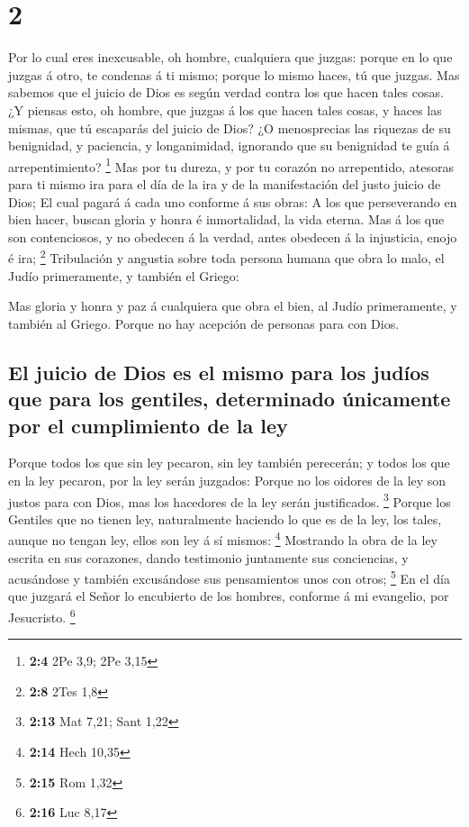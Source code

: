 \hypertarget{section-1}{%
\section{2}\label{section-1}}

 Por lo cual eres inexcusable, oh hombre, cualquiera que
juzgas: porque en lo que juzgas á otro, te condenas á ti mismo; porque
lo mismo haces, tú que juzgas.  Mas sabemos que el juicio
de Dios es según verdad contra los que hacen tales cosas. 
¿Y piensas esto, oh hombre, que juzgas á los que hacen tales cosas, y
haces las mismas, que tú escaparás del juicio de Dios?  ¿O
menosprecias las riquezas de su benignidad, y paciencia, y longanimidad,
ignorando que su benignidad te guía á arrepentimiento? \footnote{\textbf{2:4}
  2Pe 3,9; 2Pe 3,15}  Mas por tu dureza, y por tu corazón
no arrepentido, atesoras para ti mismo ira para el día de la ira y de la
manifestación del justo juicio de Dios;  El cual pagará á
cada uno conforme á sus obras:  A los que perseverando en
bien hacer, buscan gloria y honra é inmortalidad, la vida eterna.
 Mas á los que son contenciosos, y no obedecen á la
verdad, antes obedecen á la injusticia, enojo é ira; \footnote{\textbf{2:8}
  2Tes 1,8}  Tribulación y angustia sobre toda persona
humana que obra lo malo, el Judío primeramente, y también el Griego:

 Mas gloria y honra y paz á cualquiera que obra el bien,
al Judío primeramente, y también al Griego.  Porque no
hay acepción de personas para con Dios.

\hypertarget{el-juicio-de-dios-es-el-mismo-para-los-juduxedos-que-para-los-gentiles-determinado-uxfanicamente-por-el-cumplimiento-de-la-ley}{%
\subsection{El juicio de Dios es el mismo para los judíos que para los
gentiles, determinado únicamente por el cumplimiento de la
ley}\label{el-juicio-de-dios-es-el-mismo-para-los-juduxedos-que-para-los-gentiles-determinado-uxfanicamente-por-el-cumplimiento-de-la-ley}}

 Porque todos los que sin ley pecaron, sin ley también
perecerán; y todos los que en la ley pecaron, por la ley serán juzgados:
 Porque no los oidores de la ley son justos para con
Dios, mas los hacedores de la ley serán justificados. \footnote{\textbf{2:13}
  Mat 7,21; Sant 1,22}  Porque los Gentiles que no tienen
ley, naturalmente haciendo lo que es de la ley, los tales, aunque no
tengan ley, ellos son ley á sí mismos: \footnote{\textbf{2:14} Hech
  10,35}  Mostrando la obra de la ley escrita en sus
corazones, dando testimonio juntamente sus conciencias, y acusándose y
también excusándose sus pensamientos unos con otros; \footnote{\textbf{2:15}
  Rom 1,32}  En el día que juzgará el Señor lo encubierto
de los hombres, conforme á mi evangelio, por Jesucristo. \footnote{\textbf{2:16}
  Luc 8,17}

